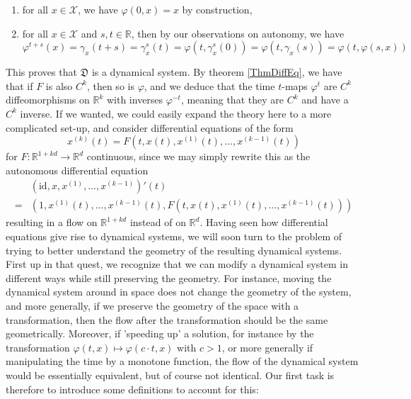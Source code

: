 \documentclass[11pt, a4paper]{memoir}
\theoremstyle{break}
\theoremstyle{break}
\theoremstyle{nonumberplain}
\newcommand{\mR}{\mathbb{R}}
\begin{document}
\begin{enumerate}[label=(\roman*)]
	\item for all $x\in \mathcal{X}$, we have $\varphi(0,x)=x$ by construction,
	\item for all $x\in \mathcal{X}$ and $s,t\in \mR$, then by our observations on autonomy, we have
	$$\varphi^{t+s}(x)=\gamma_x(t+s)=\gamma_x^s(t)=\varphi(t,\gamma_x^s(0))=\varphi(t,\gamma_x(s))=\varphi(t,\varphi(s,x))$$
\end{enumerate}
This proves that $\mathfrak{D}$ is a dynamical system. By theorem \ref{ThmDiffEq}, we have that if $F$ is also $C^k$, then so is $\varphi$, and we deduce that the time $t$-maps $\varphi^t$ are $C^k$ diffeomorphisms on $\mR^k$ with inverses $\varphi^{-t}$, meaning that they are $C^k$ and have a $C^k$ inverse. If we wanted, we could easily expand the theory here to a more complicated set-up, and consider differential equations of the form
$$x^{(k)}(t)=F\left(t,x(t),x^{(1)}(t),\ldots, x^{(k-1)}(t)\right)$$
for $F:\mR^{1+kd}\to\mR^d$ continuous, since we may simply rewrite this as the autonomous differential equation
\begin{align*}
&\left(\text{id},x,x^{(1)},\ldots,x^{(k-1)}\right)'(t)\\
=&\left(1,x^{(1)}(t),\ldots,x^{(k-1)}(t),F\left(t,x(t),x^{(1)}(t),\ldots, x^{(k-1)}(t)\right)\right)
\end{align*}
resulting in a flow on $\mR^{1+kd}$ instead of on $\mR^d$. Having seen how differential equations give rise to dynamical systems, we will soon turn to the problem of trying to better understand the geometry of the  resulting dynamical systems. First up in that quest, we recognize that we can modify a dynamical system in different ways while still preserving the geometry. For instance, moving the dynamical system around in space does not change the geometry of the system, and more generally, if we preserve the geometry of the space with a transformation, then the flow after the transformation should be the same geometrically. Moreover, if 'speeding up' a solution, for instance by the transformation $\varphi(t,x)\mapsto\varphi(c\cdot t,x)$ with $c>1$, or  more generally if manipulating the time by a monotone function, the flow of the dynamical system would be essentially equivalent, but of course not identical. Our first task is therefore to introduce some definitions to account for this:
\end{document}
